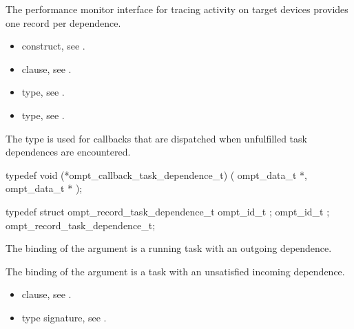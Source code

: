 The performance monitor interface for tracing activity on target devices 
provides one record per dependence.

\crossreferences
\begin{itemize}
\item {} construct, see .

\item {} clause, see .

\item {} type, see
.

\item {} type, see
.
\end{itemize}



\label{sec:ompt_callback_task_dependence_t}
\summary
The  type is used for callbacks that are 
dispatched when unfulfilled task dependences are encountered.

\format
\begin{ccppspecific}
\begin{omptCallback}
typedef void (*ompt_callback_task_dependence_t) (
  ompt_data_t *,
  ompt_data_t *
);
\end{omptCallback}
\end{ccppspecific}

\record
\begin{ccppspecific}
\begin{omptRecord}
typedef struct ompt_record_task_dependence_t {
  ompt_id_t ;
  ompt_id_t ;
} ompt_record_task_dependence_t;
\end{omptRecord}
\end{ccppspecific}

\argdesc
The binding of the  argument is a running task
with an outgoing dependence.

The binding of the  argument is a task with an
unsatisfied incoming dependence.

\crossreferences
\begin{itemize}
\item {} clause, see .

\item {} type signature, see
.
\end{itemize}



